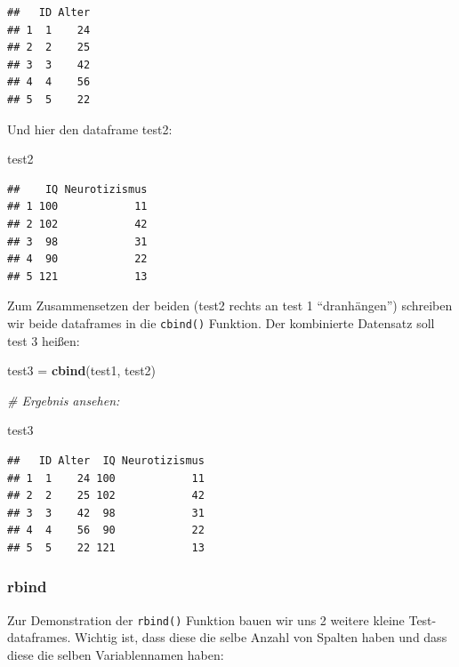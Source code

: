 \documentclass[
]{book}
\newenvironment{Shaded}{\begin{snugshade}}{\end{snugshade}}
\newcommand{\CommentTok}[1]{\textcolor[rgb]{0.56,0.35,0.01}{\textit{#1}}}
\newcommand{\FunctionTok}[1]{\textcolor[rgb]{0.13,0.29,0.53}{\textbf{#1}}}
\newcommand{\NormalTok}[1]{#1}
\newcommand{\OtherTok}[1]{\textcolor[rgb]{0.56,0.35,0.01}{#1}}
\begin{document}
\begin{verbatim}
##   ID Alter
## 1  1    24
## 2  2    25
## 3  3    42
## 4  4    56
## 5  5    22
\end{verbatim}

Und hier den dataframe test2:

\begin{Shaded}
\begin{Highlighting}[]
\NormalTok{test2}
\end{Highlighting}
\end{Shaded}

\begin{verbatim}
##    IQ Neurotizismus
## 1 100            11
## 2 102            42
## 3  98            31
## 4  90            22
## 5 121            13
\end{verbatim}

Zum Zusammensetzen der beiden (test2 rechts an test 1 ``dranhängen'') schreiben wir beide dataframes in die \texttt{cbind()} Funktion. Der kombinierte Datensatz soll test 3 heißen:

\begin{Shaded}
\begin{Highlighting}[]
\NormalTok{test3 }\OtherTok{=} \FunctionTok{cbind}\NormalTok{(test1, test2)}

\CommentTok{\# Ergebnis ansehen:}

\NormalTok{test3}
\end{Highlighting}
\end{Shaded}

\begin{verbatim}
##   ID Alter  IQ Neurotizismus
## 1  1    24 100            11
## 2  2    25 102            42
## 3  3    42  98            31
## 4  4    56  90            22
## 5  5    22 121            13
\end{verbatim}

\subsubsection{rbind}\label{rbind}

Zur Demonstration der \texttt{rbind()} Funktion bauen wir uns 2 weitere kleine Test-dataframes. Wichtig ist, dass diese die selbe Anzahl von Spalten haben und dass diese die selben Variablennamen haben:
\end{document}
